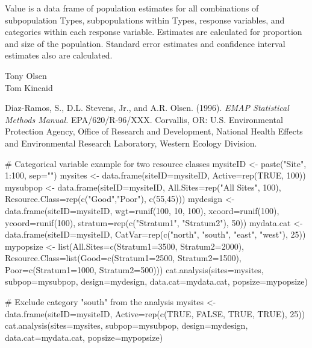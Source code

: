 \begin{Value}
Value is a data frame of population estimates for all combinations of subpopulation 
Types, subpopulations within Types, response variables, and categories within 
each response variable.  Estimates are calculated for proportion and size of 
the population.  Standard error estimates and  confidence interval estimates 
also are calculated.
\end{Value}
\begin{Author}\relax
Tony Olsen \\
Tom Kincaid 
\end{Author}
\begin{References}\relax
Diaz-Ramos, S., D.L. Stevens, Jr., and A.R. Olsen. (1996).  \emph{EMAP
Statistical Methods Manual.} EPA/620/R-96/XXX.  Corvallis, OR: U.S.
Environmental Protection Agency, Office of Research and Development, National
Health Effects and Environmental Research Laboratory, Western Ecology
Division.
\end{References}
\begin{SeeAlso}\relax
{}
\end{SeeAlso}
\begin{Examples}
\begin{ExampleCode}
# Categorical variable example for two resource classes
mysiteID <- paste("Site", 1:100, sep="")
mysites <- data.frame(siteID=mysiteID, Active=rep(TRUE, 100))
mysubpop <- data.frame(siteID=mysiteID, All.Sites=rep("All Sites", 100),
   Resource.Class=rep(c("Good","Poor"), c(55,45)))
mydesign <- data.frame(siteID=mysiteID, wgt=runif(100, 10, 100),
   xcoord=runif(100), ycoord=runif(100), stratum=rep(c("Stratum1",
   "Stratum2"), 50))
mydata.cat <- data.frame(siteID=mysiteID, CatVar=rep(c("north", "south",
   "east", "west"), 25))
mypopsize <- list(All.Sites=c(Stratum1=3500, Stratum2=2000),
   Resource.Class=list(Good=c(Stratum1=2500, Stratum2=1500),
   Poor=c(Stratum1=1000, Stratum2=500)))
cat.analysis(sites=mysites, subpop=mysubpop, design=mydesign,
   data.cat=mydata.cat, popsize=mypopsize)

# Exclude category "south" from the analysis
mysites <- data.frame(siteID=mysiteID, Active=rep(c(TRUE, FALSE, TRUE,
   TRUE), 25))
cat.analysis(sites=mysites, subpop=mysubpop, design=mydesign,
   data.cat=mydata.cat, popsize=mypopsize)
\end{ExampleCode}
\end{Examples}


